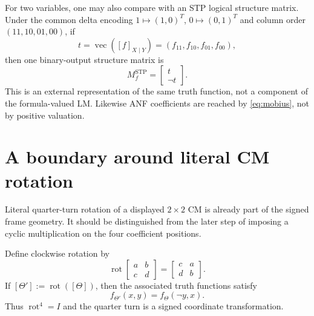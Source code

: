 \documentclass[11pt]{article}
\theoremstyle{definition}
\theoremstyle{remark}
\newcommand{\rot}{\operatorname{rot}}
\newcommand{\vecop}{\operatorname{vec}}
\begin{document}
For two variables, one may also compare with an STP logical structure matrix.  Under the common delta encoding $1\mapsto(1,0)^T$, $0\mapsto(0,1)^T$ and column order $(11,10,01,00)$, if
\[
 t=\vecop([f]_{X\mid Y})=(f_{11},f_{10},f_{01},f_{00}),
\]
then one binary-output structure matrix is
\[
 M_f^{\mathrm{STP}}=\begin{bmatrix}t\\\neg t\end{bmatrix}.
\]
This is an external representation of the same truth function, not a component of the formula-valued LM.  Likewise ANF coefficients are reached by \eqref{eq:mobius}, not by positive valuation.

\section{A boundary around literal CM rotation}
\label{sec:rotationboundary}

Literal quarter-turn rotation of a displayed $2\times2$ CM is already part of the signed frame geometry.  It should be distinguished from the later step of imposing a cyclic multiplication on the four coefficient positions.

Define clockwise rotation by
\begin{equation}
 \rot\begin{bmatrix}a&b\\c&d\end{bmatrix}
 =\begin{bmatrix}c&a\\d&b\end{bmatrix}.
 \label{eq:rotation}
\end{equation}
If $[\Theta']:=\rot([\Theta])$, then the associated truth functions satisfy
\begin{equation}
 f_{\Theta'}(x,y)=f_\Theta(\neg y,x).
 \label{eq:rotationlogic}
\end{equation}
Thus $\rot^4=I$ and the quarter turn is a signed coordinate transformation.
\end{document}
